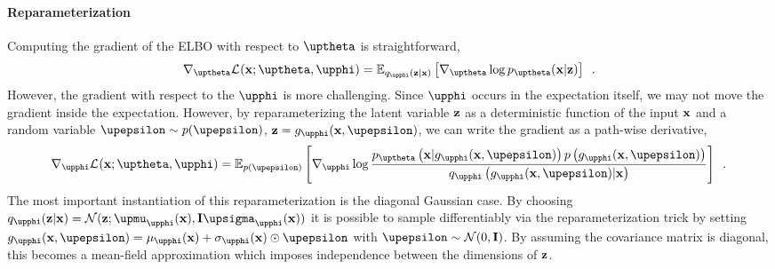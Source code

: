 

\paragraph{Reparameterization} 
Computing the gradient of the ELBO with respect to $\thetab$ is straightforward,
%
\begin{equation}
    \nabla_\thetab \mathcal{L}_{}(\xb;\thetab,\phib)
    = \mathbb{E}_{q_\phib(\zb|\xb)} \left[ \nabla_\thetab \log p_\thetab(\xb|\zb) \right] \enspace .
\end{equation}
%
However, the gradient with respect to the $\phib$ is more challenging. Since $\phib$ occurs in the expectation itself, we may not move the gradient inside the expectation. 
However, by reparameterizing the latent variable ${\mathbf{z}}$ as a deterministic function of the input ${\mathbf{x}}$ and a random variable $\epsilonb\sim p(\epsilonb)$, $\zb = g_\phib(\xb,\epsilonb)$, we can write the gradient as a path-wise derivative,
%
\begin{equation}
    \nabla_\phib \mathcal{L}_{}(\xb;\thetab,\phib)
    = \mathbb{E}_{p(\epsilonb)} \left[ \nabla_\phib \log \frac{p_\thetab\left(\xb|g_\phib(\xb,\epsilonb)\right)p\left(g_\phib(\xb,\epsilonb)\right)}{q_\phib\left(g_\phib(\xb,\epsilonb)|\xb\right)} \right] \enspace . \\
\end{equation}
%
The most important instantiation of this reparameterization is the diagonal Gaussian case. 
By choosing $q_\phib(\zb|\xb) = \mathcal{N}(\zb; \mub_\phib(\xb), \mathbf{I}\sigmab_\phib(\xb))$ it is possible to sample differentiably via the reparameterization trick by setting $g_\phib(\xb,\epsilonb) = \mu_\phib(\xb) + \sigma_\phib(\xb) \odot \epsilonb$ with $\epsilonb\sim\mathcal{N}(0,\mathbf{I})$. 
By assuming the covariance matrix is diagonal, this becomes a mean-field approximation which imposes independence between the dimensions of ${\mathbf{z}}$. 

